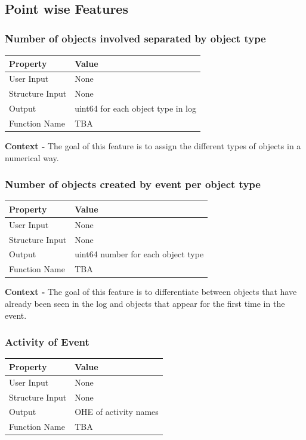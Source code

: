 \documentclass{article}
\begin{document}
\subsection{Point wise Features}

\subsubsection{Number of objects involved separated by object type}
\begin{center}
	\begin{tabular}{| p{3cm} p{7cm} |}
		\hline
		\textbf{Property} & \textbf{Value}\\
		\hline
		User Input & None\\
		Structure Input & None\\
		Output & uint64 for each object type in log\\
		Function Name & TBA\\
		\hline
	\end{tabular}
\end{center}

\textbf{Context -} The goal of this feature is to assign the different types of objects in a numerical way.
\\

\subsubsection{Number of objects created by event per object type}
\begin{center}
	\begin{tabular}{| p{3cm} p{7cm} |}
		\hline
		\textbf{Property} & \textbf{Value}\\
		\hline
		User Input & None\\
		Structure Input & None\\
		Output & uint64 number for each object type\\
		Function Name & TBA\\
		\hline
	\end{tabular}
\end{center}

\textbf{Context -} The goal of this feature is to differentiate between objects that have already been seen in the log and objects that appear for the first time in the event.
\\

\subsubsection{Activity of Event}
\begin{center}
	\begin{tabular}{| p{3cm} p{7cm} |}
		\hline
		\textbf{Property} & \textbf{Value}\\
		\hline
		User Input & None\\
		Structure Input & None\\
		Output & OHE of activity names\\
		Function Name & TBA\\
		\hline
	\end{tabular}
\end{center}
\end{document}
